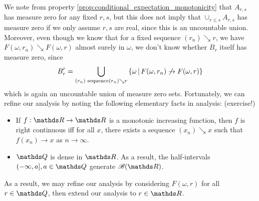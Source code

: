 \begin{unexaminable}
\begin{hint}
We note from property \ref{prop:conditional_expectation_monotonicity} that $A_{r,s}$ has measure zero for any fixed $r,s$, but this does not imply that $\cup_{r\leq s} A_{r,s}$ has measure zero if we only assume $r,s$ are real, since this is an uncountable union. Moreover, even though we know that for a fixed sequence $(r_n) \searrow r$, we have $F(\omega,r_n) \searrow F(\omega,r)$ almost surely in $\omega$, we don't know whether $B_r$ itself has measure zero, since
\begin{equation}
    B_r' = \bigcup_{(r_n) \text{ sequence} \\ (r_n) \searrow r} \left\{ \omega \,|\, F(\omega,r_n) \not\to F(\omega,r) \right \}
\end{equation}
which is again an uncountable union of measure zero sets. Fortunately, we can refine our analysis by noting the following elementary facts in analysis: (exercise!)
\begin{itemize}
    \item If $f:\R \to \R$ is a monotonic increasing function, then $f$ is right continuous iff for all $x$, there exists a sequence $(x_n) \searrow x$ such that $f(x_n) \to x$ as $n \to \infty$.
    \item $\Q$ is dense in $\R$. As a result, the half-intervals $(-\infty,a], a\in \Q$ generate $\B(\R)$.
\end{itemize}
As a result, we may refine our analysis by considering $F(\omega,r)$ for all $r \in \Q$, then extend our analysis to $r \in \R$.
\end{hint}


\end{unexaminable}
